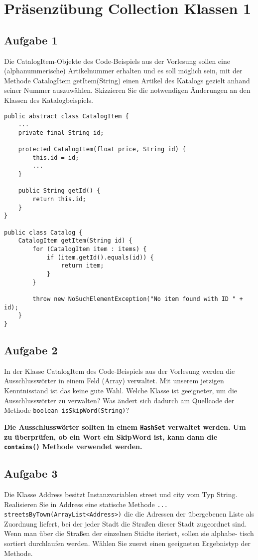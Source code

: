 \chapter{Präsenzübung Collection \newline Klassen 1}

\section{Aufgabe 1}
Die CatalogItem-Objekte des Code-Beispiels aus der Vorlesung sollen eine
(alphanummerische) Artikelnummer erhalten und es soll möglich sein, mit der
Methode CatalogItem getItem(String) einen Artikel des Katalogs gezielt anhand
seiner Nummer auszuwählen. Skizzieren Sie die notwendigen Änderungen an den
Klassen des Katalogbeispiels.

\begin{lstlisting}
public abstract class CatalogItem {
    ...
    private final String id;

    protected CatalogItem(float price, String id) {
        this.id = id;
        ...
    }

    public String getId() {
        return this.id;
    }
}

public class Catalog {
    CatalogItem getItem(String id) {
        for (CatalogItem item : items) {
            if (item.getId().equals(id)) {
                return item;
            }
        }

        throw new NoSuchElementException("No item found with ID " + id);
    }
}
\end{lstlisting}

\section{Aufgabe 2}
In der Klasse CatalogItem des Code-Beispiels aus der Vorlesung werden die
Ausschlusswörter in einem Feld (Array) verwaltet. Mit unserem jetzigen
Kenntnisstand ist das keine gute Wahl. Welche Klasse ist geeigneter, um die
Ausschlusswörter zu verwalten? Was ändert sich dadurch am Quellcode der Methode
\lstinline{boolean isSkipWord(String)}?

\textbf{Die Ausschlusswörter sollten in einem \lstinline{HashSet} verwaltet werden. Um zu überprüfen, ob ein Wort ein SkipWord ist, kann dann die \lstinline{contains()} Methode verwendet werden.}

\section{Aufgabe 3}
Die Klasse Address besitzt Instanzvariablen street und city vom Typ String.
Realisieren Sie in Address eine statische Methode 
\lstinline{... streetsByTown(ArrayList<Address>)} die die Adressen der übergebenen Liste als
Zuordnung liefert, bei der jeder Stadt die Straßen dieser Stadt zugeordnet
sind. Wenn man über die Straßen der einzelnen Städte iteriert, sollen sie
alphabe- tisch sortiert durchlaufen werden. Wählen Sie zuerst einen geeigneten
Ergebnistyp der Methode.

